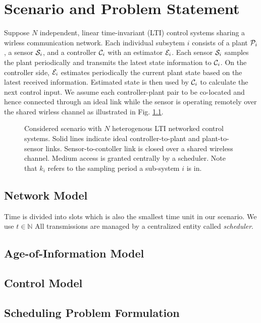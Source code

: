 \chapter{Scenario and Problem Statement}

Suppose $N$ independent, linear time-invariant (LTI) control systems sharing a
wirless communication network. Each individual subsytem $i$ consists of a plant
$\mathcal{P}_i$, a sensor $\mathcal{S}_i$, and a controller $\mathcal{C}_i$ with an estimator
$\mathcal{E}_i$. Each sensor $\mathcal{S}_i$ samples the plant periodically and transmits
the latest state information to $\mathcal{C}_i$. On the controller side,
$\mathcal{E}_i$ estimates periodically the current plant state based on the latest
received information. Estimated state is then used by $\mathcal{C}_i$ to calculate
the next control input. We assume each controller-plant pair to be co-located
and hence connected through an ideal link while the sensor is operating remotely
over the shared wirless channel as illustrated in Fig. \ref{fig:scenario}.

\begin{figure}[h]
  \centering
  
  \caption[Scheme of $N$ subsytems sharing a wirelss communication medium]{Considered scenario with $N$ heterogenous LTI networked control systems. Solid lines indicate ideal controller-to-plant and plant-to-sensor links. Sensor-to-contoller link is closed over a shared wireless channel. Medium access is granted centrally by a scheduler. Note that $k_i$ refers to the sampling period a sub-system $i$ is in.}
  \label{fig:scenario}
\end{figure}


\section{Network Model}
Time is divided into slots which is also the smallest time unit in our scenario.
We use $t \in \mathbb{N}$ All transmissions are managed by a centralized entity
called \textit{scheduler}.

\section{Age-of-Information Model}

\section{Control Model}

\section{Scheduling Problem Formulation} \label{sec:problem}
